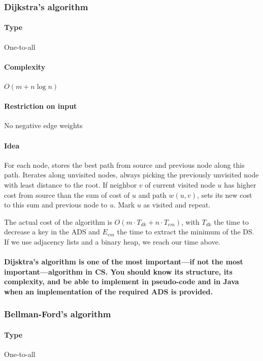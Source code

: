 \documentclass[a4paper]{article}
\begin{document}
\subsubsection{Dijkstra's algorithm}

\paragraph{Type} One-to-all

\paragraph{Complexity} $O\left(m+n\log n\right)$

\paragraph{Restriction on input} No negative edge weights

\paragraph{Idea} For each node, stores the best path from source and previous node along this path. Iterates along unvisited nodes, always picking the previously unvisited node with least distance to the root. If neighbor $v$ of current visited node $u$ has higher cost from source than the sum of cost of $u$ and path $w(u,v)$, sets its new cost to this sum and previous node to $u$. Mark $u$ as visited and repeat.

The actual cost of the algorithm is $O(m\cdot T_{dk} + n\cdot T_{em})$, with $T_{dk}$ the time to decrease a key in the ADS and $E_{em}$ the time to extract the minimum of the DS. If we use adjacency lists and a binary heap, we reach our time above.

\paragraph{Dijsktra's algorithm is one of the most important---if not the most important---algorithm in CS. You should know its structure, its complexity, and be able to implement in pseudo-code and in Java when an implementation of the required ADS is provided.}

\subsubsection{Bellman-Ford's algorithm}

\paragraph{Type} One-to-all
\end{document}
